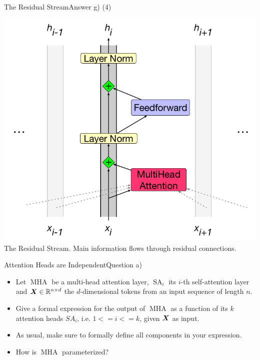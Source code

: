 \documentclass[t]{beamer}
\newcommand\op[1]{\operatorname{#1}}
\begin{document}
\begin{frame}{The Residual Stream}{Answer g) (4)}
    \begin{center}
        \includegraphics[scale=0.27]{img/residual_stream.png}
        \\ The Residual Stream. Main information flows through residual
        connections.
    \end{center}
\end{frame}

\begin{frame}{Attention Heads are Independent}{Question a)}
    \begin{itemize}
        \item Let $\op{MHA}$ be a multi-head attention layer, $\op{SA}_i$ its
              $i$-th self-attention layer and ${\boldsymbol{X}}\in \mathbb{R}^{n\times d}$ the
              $d$-dimensional tokens from an input sequence of length $n$.
        \item Give a formal expression for the output of $\op{MHA}$ as a
              function of its $k$ attention heads $SA_i$, i.e. $1 <= i <= k$,
              given ${\boldsymbol{X}}$ as input.
        \item As usual, make sure to formally define all components in your
              expression.
        \item How is $\op{MHA}$ parameterized?
    \end{itemize}
\end{frame}
\end{document}
